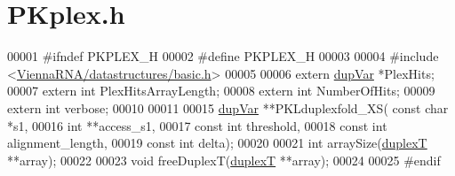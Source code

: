 \hypertarget{PKplex_8h_source}{}\section{P\+Kplex.\+h}
\label{PKplex_8h_source}

\begin{DoxyCode}
00001 \textcolor{preprocessor}{#ifndef PKPLEX\_H}
00002 \textcolor{preprocessor}{#define PKPLEX\_H}
00003 
00004 \textcolor{preprocessor}{#include <\hyperlink{datastructures_2basic_8h}{ViennaRNA/datastructures/basic.h}>}
00005 
00006 \textcolor{keyword}{extern} \hyperlink{group__data__structures_structdupVar}{dupVar} *PlexHits;
00007 \textcolor{keyword}{extern} \textcolor{keywordtype}{int}    PlexHitsArrayLength;
00008 \textcolor{keyword}{extern} \textcolor{keywordtype}{int}    NumberOfHits;
00009 \textcolor{keyword}{extern} \textcolor{keywordtype}{int}    verbose;
00010 
00011 
00015 \hyperlink{group__data__structures_structdupVar}{dupVar}  **PKLduplexfold\_XS( \textcolor{keyword}{const} \textcolor{keywordtype}{char} *s1,
00016                             \textcolor{keywordtype}{int} **access\_s1,
00017                             \textcolor{keyword}{const} \textcolor{keywordtype}{int} threshold,
00018                             \textcolor{keyword}{const} \textcolor{keywordtype}{int} alignment\_length,
00019                             \textcolor{keyword}{const} \textcolor{keywordtype}{int} delta);
00020 
00021 \textcolor{keywordtype}{int}     arraySize(\hyperlink{group__data__structures_structduplexT}{duplexT} **array);
00022 
00023 \textcolor{keywordtype}{void}    freeDuplexT(\hyperlink{group__data__structures_structduplexT}{duplexT} **array);
00024 
00025 \textcolor{preprocessor}{#endif}
\end{DoxyCode}
